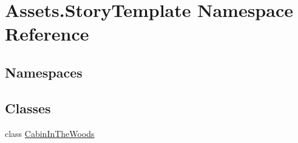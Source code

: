 \hypertarget{namespaceAssets_1_1StoryTemplate}{}\section{Assets.\+Story\+Template Namespace Reference}
\label{namespaceAssets_1_1StoryTemplate}
\subsection*{Namespaces}
\begin{DoxyCompactItemize}
\end{DoxyCompactItemize}
\subsection*{Classes}
\begin{DoxyCompactItemize}
\item 
class \hyperlink{classAssets_1_1StoryTemplate_1_1CabinInTheWoods}{Cabin\+In\+The\+Woods}
\end{DoxyCompactItemize}
